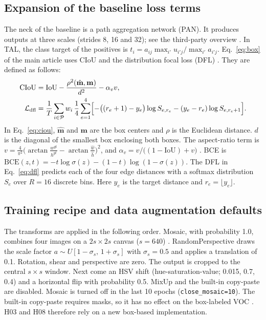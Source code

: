 \subsection{Expansion of the baseline loss terms}\label{sec:ek-kayip}
The neck of the baseline is a path aggregation network (PAN). It produces outputs at three scales (strides 8, 16 and 32); see the third-party overview \cite{khanam_2024_yolov11overview}. In TAL, the class target of the positives is $t_i=a_{ij}\max_{i'}u_{i'j}/\max_{i'}a_{i'j}$. Eq.~\eqref{eq:box} of the main article uses CIoU \cite{zheng_2020_diou} and the distribution focal loss (DFL) \cite{li_2020_gfl}. They are defined as follows:
\begin{align}
\mathrm{CIoU}&=\mathrm{IoU}-\frac{\rho^2(\hat{\mathbf m},\mathbf m)}{d^2}-\alpha_v v,\label{eq:ciou}\\
\mathcal L_{\mathrm{dfl}}&=\frac1T\sum_{i\in\mathcal P}w_i\,\frac14\sum_{e=1}^{4}\Bigl[-\bigl((r_e+1)-y_e\bigr)\log S_{e,r_e}-(y_e-r_e)\log S_{e,r_e+1}\Bigr].\label{eq:dfl}
\end{align}
In Eq.~\eqref{eq:ciou}, $\hat{\mathbf m}$ and $\mathbf m$ are the box centers and $\rho$ is the Euclidean distance. $d$ is the diagonal of the smallest box enclosing both boxes. The aspect-ratio term is $v=\frac4{\pi^2}\bigl(\arctan\frac{w^{gt}}{h^{gt}}-\arctan\frac{\hat w}{\hat h}\bigr)^{2}$, and $\alpha_v=v/\bigl((1-\mathrm{IoU})+v\bigr)$ \cite{zheng_2020_diou}. BCE is $\mathrm{BCE}(z,t)=-t\log\sigma(z)-(1-t)\log(1-\sigma(z))$. The DFL in Eq.~\eqref{eq:dfl} \cite{li_2020_gfl} predicts each of the four edge distances with a softmax distribution $S_e$ over $R=16$ discrete bins. Here $y_e$ is the target distance and $r_e=\lfloor y_e\rfloor$.

\subsection{Training recipe and data augmentation defaults}\label{sec:ek-recete}
The transforms are applied in the following order. Mosaic, with probability 1.0, combines four images on a $2s\times2s$ canvas ($s=640$) \cite{bochkovskiy_2020_yolov4}. RandomPerspective draws the scale factor $a\sim U[1-\sigma_s,\,1+\sigma_s]$ with $\sigma_s=0.5$ and applies a translation of 0.1. Rotation, shear and perspective are zero. The output is cropped to the central $s\times s$ window. Next come an HSV shift (hue-saturation-value; 0.015, 0.7, 0.4) and a horizontal flip with probability 0.5. MixUp and the built-in copy-paste are disabled. Mosaic is turned off in the last 10 epochs (\texttt{close\_mosaic=10}). The built-in copy-paste requires masks, so it has no effect on the box-labeled VOC \cite{ultralytics_2026_augdocs}. H03 and H08 therefore rely on a new box-based implementation.

